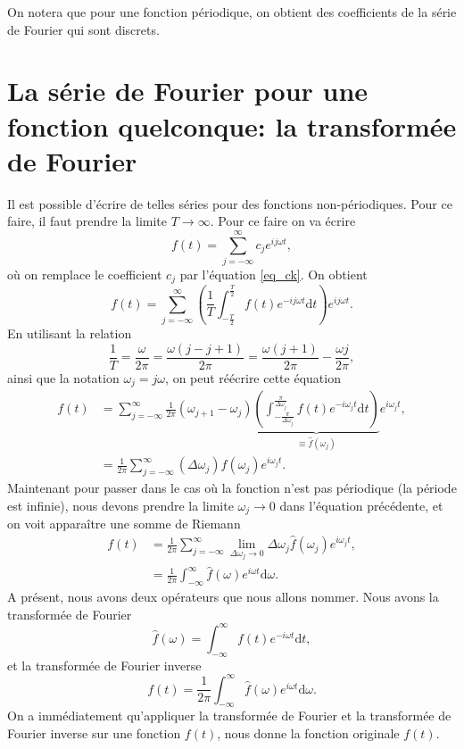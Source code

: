 \documentclass[a4paper,12pt]{book}
\newcommand{\dd}{\mathrm{d}}
\newcommand{\fh}{\hat{f}}
\begin{document}
On notera que pour une fonction périodique, on obtient des coefficients de la série de Fourier qui sont discrets.

\section{La série de Fourier pour une fonction quelconque: la transformée de Fourier}

Il est possible d'écrire de telles séries pour des fonctions non-périodiques. Pour ce faire, il faut prendre la limite $T\rightarrow\infty$. 
Pour ce faire on va écrire
\begin{equation*}
 f(t)=\sum_{j=-\infty}^\infty c_je^{ij\omega t},
\end{equation*}
où on remplace le coefficient $c_j$ par l'équation \eqref{eq_ck}. On obtient
\begin{equation*}
 f(t)=\sum_{j=-\infty}^\infty \left(\frac{1}{T}\int_{-\frac{T}{2}}^{\frac{T}{2}}f(t)e^{-ij\omega t}\dd t\right) e^{ij\omega t}.
\end{equation*}
En utilisant la relation 
\begin{equation*}
 \frac{1}{T}=\frac{\omega}{2\pi}=\frac{\omega(j-j+1)}{2\pi}=\frac{\omega(j+1)}{2\pi}-\frac{\omega j}{2\pi},
\end{equation*}
ainsi que la notation $\omega_j=j\omega$, on peut réécrire cette équation
\begin{align}
 f(t)&=\sum_{j=-\infty}^\infty \frac{1}{2\pi}(\omega_{j+1}-\omega_j)\underbrace{\left(\int_{-\frac{\pi}{\Delta \omega_j}}^{\frac{\pi}{\Delta \omega_j}}f(t)e^{-i\omega_j t}\dd t\right)}_{\equiv \fh(\omega_j)} e^{i\omega_j t},\nonumber\\
     &=\frac{1}{2\pi}\sum_{j=-\infty}^\infty (\Delta \omega_j)\fh(\omega_j) e^{i\omega_j t}.
\end{align}
Maintenant pour passer dans le cas où la fonction n'est pas périodique (la période est infinie), nous
devons prendre la limite $\omega_j\rightarrow 0$ dans l'équation précédente, et on voit apparaître une somme de Riemann
\begin{align}
 f(t)&=\frac{1}{2\pi}\sum_{j=-\infty}^\infty \lim\limits_{\Delta \omega_j\rightarrow 0}\Delta \omega_j\fh(\omega_j) e^{i\omega_j t},\nonumber\\
 &=\frac{1}{2\pi}\int_{-\infty}^\infty \fh(\omega) e^{i\omega t}\dd\omega.
\end{align}
A présent, nous avons deux opérateurs que nous allons nommer. Nous avons la transformée de Fourier
\begin{equation}
 \fh(\omega)=\int_{-\infty}^{\infty}f(t)e^{-i\omega t}\dd t,\label{eq_fourier_transform}
\end{equation}
et la transformée de Fourier inverse
\begin{equation}
 f(t)=\frac{1}{2\pi}\int_{-\infty}^\infty \fh(\omega) e^{i\omega t}\dd\omega.\label{eq_inverse_fourier_transform}
\end{equation}
On a immédiatement qu'appliquer la transformée de Fourier et la transformée de Fourier inverse sur 
une fonction $f(t)$, nous donne la fonction originale $f(t)$.
\end{document}
